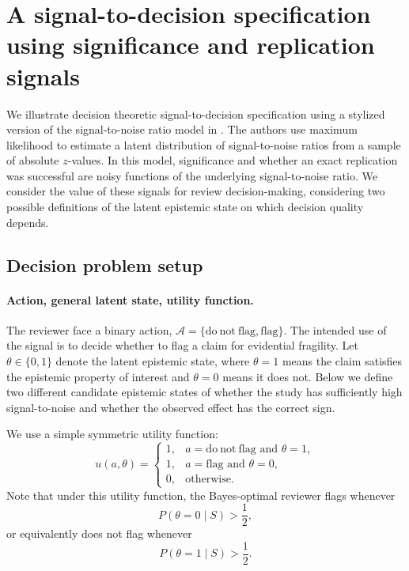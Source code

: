 \section{A signal-to-decision specification using significance and replication signals}
\label{app:snr-example}

We illustrate decision theoretic signal-to-decision specification using a stylized version of the signal-to-noise ratio model in \citet{vanzwet2026}. The authors 
use maximum likelihood to estimate a latent distribution of signal-to-noise ratios from a sample of absolute $z$-values. In this model, significance and whether an exact replication was successful are noisy functions of the underlying signal-to-noise ratio. We consider the value of these signals for review decision-making, considering two possible definitions of the latent epistemic state on which decision quality depends.

\subsection{Decision problem setup}

\paragraph{Action, general latent state, utility function.}
The reviewer face a binary action, $\mathcal{A}=\{\mathrm{do\ not\ flag},\mathrm{flag}\}$. The intended use of the signal is to decide whether to flag a claim for evidential fragility. Let $\theta \in \{0,1\}$
denote the latent epistemic state, where $\theta=1$ means the claim satisfies the epistemic property of interest and $\theta=0$ means it does not. Below we define two different candidate epistemic states of whether the study has sufficiently high signal-to-noise and whether the observed effect has the correct sign.

We use a simple symmetric utility function:
\[
u(a,\theta)=
\begin{cases}
1, & a=\mathrm{do\ not\ flag} \text{ and } \theta=1,\\
1, & a=\mathrm{flag} \text{ and } \theta=0,\\
0, & \text{otherwise}.
\end{cases}
\]
Note that under this utility function, the Bayes-optimal reviewer flags whenever
\[
P(\theta=0 \mid S) > \frac{1}{2},
\]
or equivalently does not flag whenever
\[
P(\theta=1 \mid S) > \frac{1}{2}.
\]

